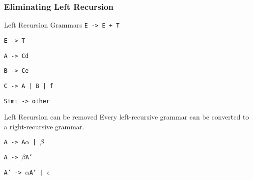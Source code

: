 \begin{frame}
\frametitle{Eliminating Left Recursion}

\begin{example}{Left Recursion Grammars}
\texttt{E -> E + T}

\texttt{E -> T}

\vspace{1em}

\texttt{A -> Cd}

\texttt{B -> Ce}

\texttt{C -> A | B | f}


\texttt{Stmt -> other}
\end{example}

\begin{block}{Left Recursion can be removed}
Every left-recursive grammar can be converted to a right-recursive grammar.

\vspace{1em}

\texttt{A -> A$\alpha$ | $\beta$}

\vspace{1em}

\texttt{A -> $\beta$A'}

\texttt{A' -> $\alpha$A' | $\epsilon$}

\end{block}

\end{frame}

